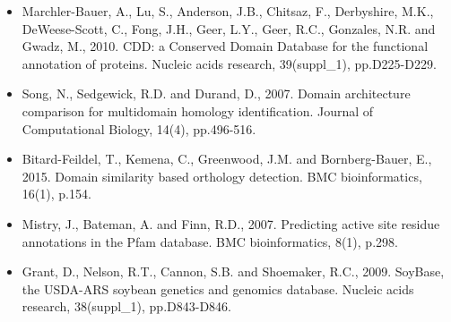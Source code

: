 \documentclass{article}
\begin{document}
\begin{itemize}
			\item Marchler-Bauer, A., Lu, S., Anderson, J.B., Chitsaz, F., Derbyshire, M.K., DeWeese-Scott, C., Fong, J.H., Geer, L.Y., Geer, R.C., Gonzales, N.R. and Gwadz, M., 2010. CDD: a Conserved Domain Database for the functional annotation of proteins. Nucleic acids research, 39(suppl\_1), pp.D225-D229.
			
			\item Song, N., Sedgewick, R.D. and Durand, D., 2007. Domain architecture comparison for multidomain homology identification. Journal of Computational Biology, 14(4), pp.496-516.
			
			\item Bitard-Feildel, T., Kemena, C., Greenwood, J.M. and Bornberg-Bauer, E., 2015. Domain similarity based orthology detection. BMC bioinformatics, 16(1), p.154.
			
			\item Mistry, J., Bateman, A. and Finn, R.D., 2007. Predicting active site residue annotations in the Pfam database. BMC bioinformatics, 8(1), p.298.
			
			\item Grant, D., Nelson, R.T., Cannon, S.B. and Shoemaker, R.C., 2009. SoyBase, the USDA-ARS soybean genetics and genomics database. Nucleic acids research, 38(suppl\_1), pp.D843-D846.
			
		\end{itemize}
	
	
	
	
\end{document}
